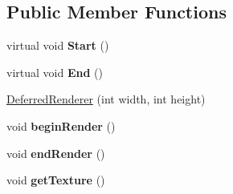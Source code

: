 \subsection*{Public Member Functions}
\begin{DoxyCompactItemize}
\item 
virtual void {\bfseries Start} ()\hypertarget{class_deferred_renderer_a2c4c90972a828c3a360a56df41a277e6}{}\label{class_deferred_renderer_a2c4c90972a828c3a360a56df41a277e6}

\item 
virtual void {\bfseries End} ()\hypertarget{class_deferred_renderer_ac1cff7897713fc988112089ed6e7f514}{}\label{class_deferred_renderer_ac1cff7897713fc988112089ed6e7f514}

\item 
\hyperlink{class_deferred_renderer_a7ff36487b21145609eb8ba107d2e1db6}{Deferred\+Renderer} (int width, int height)
\item 
void {\bfseries begin\+Render} ()\hypertarget{class_deferred_renderer_a2f9c92eb5bc1a160805849b288ad98f0}{}\label{class_deferred_renderer_a2f9c92eb5bc1a160805849b288ad98f0}

\item 
void {\bfseries end\+Render} ()\hypertarget{class_deferred_renderer_a2c21b0833c7b57ce01dd3c5017875d78}{}\label{class_deferred_renderer_a2c21b0833c7b57ce01dd3c5017875d78}

\item 
void {\bfseries get\+Texture} ()\hypertarget{class_deferred_renderer_a49db94328fb391b443755af7b5e4342e}{}\label{class_deferred_renderer_a49db94328fb391b443755af7b5e4342e}

\end{DoxyCompactItemize}
